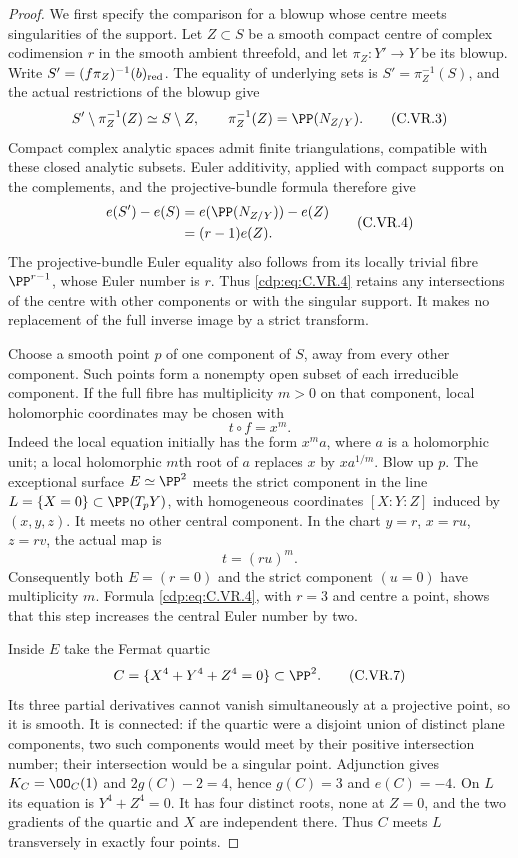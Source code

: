 \begin{proof}
We first specify the comparison for a blowup whose centre meets
singularities of the support. Let $Z\subset S$ be a smooth compact
centre of complex codimension $r$ in the smooth ambient threefold,
and let $\pi_Z:Y'\to Y$ be its blowup. Write $S'=(f\pi_Z)^{-1}(b)_{\rm red}$.
The equality of underlying sets is $S'=\pi_Z^{-1}(S)$, and the actual
restrictions of the blowup give
\[
 S'\setminus\pi_Z^{-1}(Z)\simeq S\setminus Z,
 \qquad \pi_Z^{-1}(Z)=\PP(N_{Z/Y}).                \tag{C.VR.3}\label{cdp:eq:C.VR.3}
\]
Compact complex analytic spaces admit finite triangulations, compatible
with these closed analytic subsets. Euler additivity, applied with
compact supports on the complements, and the projective-bundle
formula therefore give
\[
 \begin{split}
 e(S')-e(S)
 &=e(\PP(N_{Z/Y}))-e(Z)\\
 &=(r-1)e(Z).
 \end{split}                                      \tag{C.VR.4}\label{cdp:eq:C.VR.4}
\]
The projective-bundle Euler equality also follows from its locally
trivial fibre $\PP^{r-1}$, whose Euler number is $r$.
Thus \eqref{cdp:eq:C.VR.4} retains any intersections of the centre with other
components or with the singular support. It makes no replacement of
the full inverse image by a strict transform.

Choose a smooth point $p$ of one component of $S$, away from every
other component. Such points form a nonempty open subset of each
irreducible component. If the full fibre has multiplicity $m>0$ on
that component, local holomorphic coordinates may be chosen with
\[
                    t\circ f=x^m.                \tag{C.VR.5}\label{cdp:eq:C.VR.5}
\]
Indeed the local equation initially has the form $x^m a$, where $a$
is a holomorphic unit; a local holomorphic $m$th root of $a$ replaces
$x$ by $x a^{1/m}$. Blow up $p$. The exceptional surface
$E\simeq\PP^2$ meets the strict component in the line
$L=\{X=0\}\subset\PP(T_pY)$, with homogeneous coordinates
$[X:Y:Z]$ induced by $(x,y,z)$. It meets no other central component.
In the chart $y=r$, $x=ru$, $z=rv$, the actual map is
\[
                         t=(ru)^m.                \tag{C.VR.6}\label{cdp:eq:C.VR.6}
\]
Consequently both $E=(r=0)$ and the strict component $(u=0)$
have multiplicity $m$. Formula \eqref{cdp:eq:C.VR.4}, with $r=3$ and centre a
point, shows that this step increases the central Euler number by two.

Inside $E$ take the Fermat quartic
\[
 C=\{X^4+Y^4+Z^4=0\}\subset\PP^2.                \tag{C.VR.7}\label{cdp:eq:C.VR.7}
\]
Its three partial derivatives cannot vanish simultaneously at a
projective point, so it is smooth. It is connected: if the quartic
were a disjoint union of distinct plane components, two such
components would meet by their positive intersection number; their
intersection would be a singular point. Adjunction gives
$K_C=\OO_C(1)$ and $2g(C)-2=4$, hence $g(C)=3$ and $e(C)=-4$.
On $L$ its equation is $Y^4+Z^4=0$. It has four distinct roots,
none at $Z=0$, and the two gradients of the quartic and $X$ are
independent there. Thus $C$ meets $L$ transversely in exactly four
points.


\end{proof}
